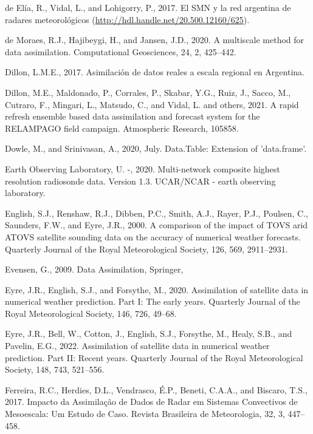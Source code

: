 \documentclass[12pt,oneside,a4paper]{reedthesis}
\begin{document}
\leavevmode\hypertarget{ref-deelia2017}{}%
de Elía, R., Vidal, L., and Lohigorry, P., 2017. El SMN y la red argentina de radares meteorológicos (\url{http://hdl.handle.net/20.500.12160/625}).

\leavevmode\hypertarget{ref-demoraes2020}{}%
de Moraes, R.J., Hajibeygi, H., and Jansen, J.D., 2020. A multiscale method for data assimilation. Computational Geosciences, 24, 2, 425--442.

\leavevmode\hypertarget{ref-dillon2017}{}%
Dillon, L.M.E., 2017. Asimilación de datos reales a escala regional en Argentina.

\leavevmode\hypertarget{ref-dillon2021}{}%
Dillon, M.E., Maldonado, P., Corrales, P., Skabar, Y.G., Ruiz, J., Sacco, M., Cutraro, F., Mingari, L., Matsudo, C., and Vidal, L. and others, 2021. A rapid refresh ensemble based data assimilation and forecast system for the RELAMPAGO field campaign. Atmospheric Research, 105858.

\leavevmode\hypertarget{ref-dowle2020}{}%
Dowle, M., and Srinivasan, A., 2020, July. Data.Table: Extension of 'data.frame'.

\leavevmode\hypertarget{ref-sondeos}{}%
Earth Observing Laboratory, U. -, 2020. Multi-network composite highest resolution radiosonde data. Version 1.3. UCAR/NCAR - earth observing laboratory.

\leavevmode\hypertarget{ref-english2000}{}%
English, S.J., Renshaw, R.J., Dibben, P.C., Smith, A.J., Rayer, P.J., Poulsen, C., Saunders, F.W., and Eyre, J.R., 2000. A comparison of the impact of TOVS arid ATOVS satellite sounding data on the accuracy of numerical weather forecasts. Quarterly Journal of the Royal Meteorological Society, 126, 569, 2911--2931.

\leavevmode\hypertarget{ref-evensen2009}{}%
Evensen, G., 2009. Data Assimilation, Springer,

\leavevmode\hypertarget{ref-eyre2020}{}%
Eyre, J.R., English, S.J., and Forsythe, M., 2020. Assimilation of satellite data in numerical weather prediction. Part I: The early years. Quarterly Journal of the Royal Meteorological Society, 146, 726, 49--68.

\leavevmode\hypertarget{ref-eyre2022}{}%
Eyre, J.R., Bell, W., Cotton, J., English, S.J., Forsythe, M., Healy, S.B., and Pavelin, E.G., 2022. Assimilation of satellite data in numerical weather prediction. Part II: Recent years. Quarterly Journal of the Royal Meteorological Society, 148, 743, 521--556.

\leavevmode\hypertarget{ref-ferreira2017}{}%
Ferreira, R.C., Herdies, D.L., Vendrasco, É.P., Beneti, C.A.A., and Biscaro, T.S., 2017. Impacto da Assimilação de Dados de Radar em Sistemas Convectivos de Mesoescala: Um Estudo de Caso. Revista Brasileira de Meteorologia, 32, 3, 447--458.
\end{document}
